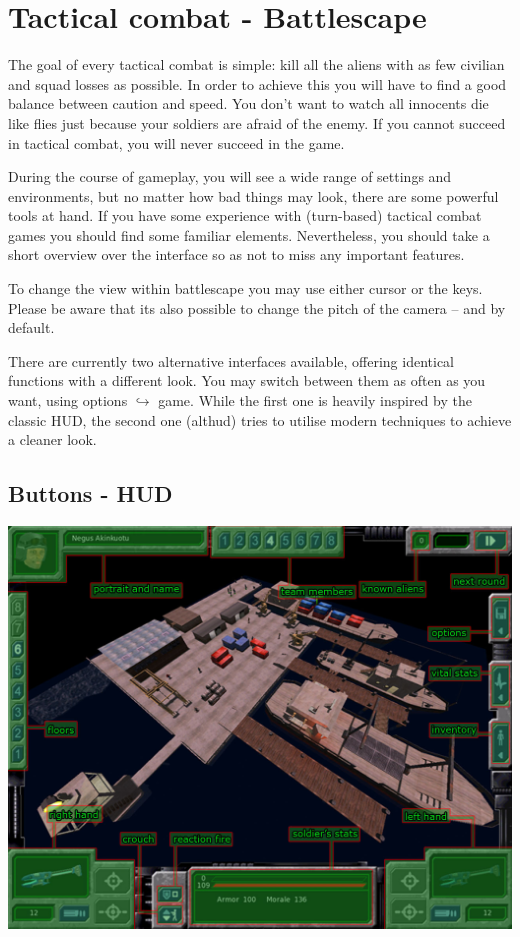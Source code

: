 \section{Tactical combat - Battlescape}

The goal of every tactical combat is simple: kill all the aliens with as few civilian and squad losses as possible. In order to achieve this you will have to find a good balance between caution and speed. You don't want to watch all innocents die like flies just because your soldiers are afraid of the enemy.  If you cannot succeed in tactical combat, you will never succeed in the game.

During the course of gameplay, you will see a wide range of settings and environments, but no matter how bad things may look, there are some powerful tools at hand. If you have some experience with (turn-based) tactical combat games you should find some familiar elements. Nevertheless, you should take a short overview over the interface so as not to miss any important features.

To change the view within battlescape you may use either cursor or the  keys. Please be aware that its also possible to change the pitch of the camera --  and  by default.

There are currently two alternative interfaces available, offering identical functions with a different look. You may switch between them as often as you want, using options $\hookrightarrow$ game. While the first one is heavily inspired by the classic HUD, the second one (althud) tries to utilise modern techniques to achieve a cleaner look.

\subsection{Buttons - HUD}
\includegraphics[width=\textwidth]{images/HUD_final.jpg}
